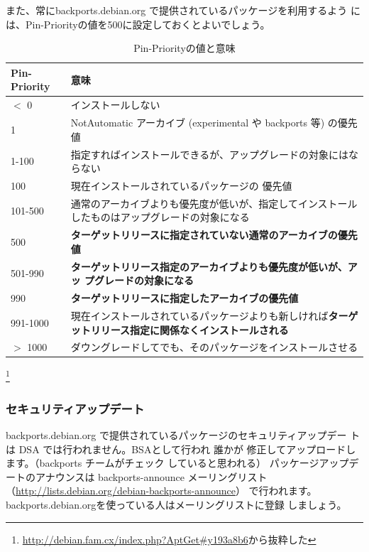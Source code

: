 \documentclass[mingoth,a4paper]{jsarticle}
\begin{document}
また、常にbackports.debian.org で提供されているパッケージを利用するよう
には、Pin-Priorityの値を500に設定しておくとよいでしょう。

\begin{table}[ht]
 \begin{center}
  \caption{Pin-Priorityの値と意味}
  \begin{tabular}{|l|p{30em}|}
   \hline
   Pin-Priority & 意味 \\ \hline \hline
   $<$ 0     & インストールしない \\ 
   1       & NotAutomatic アーカイブ (experimental や backports 等) の優先値 \\
   1-100   & 指定すればインストールできるが、アップグレードの対象にはならない\\
   100     & 現在インストールされているパッケージの 優先値\\
   101-500 & 通常のアーカイブよりも優先度が低いが、指定してインストールしたものはアップグレードの対象になる\\
   500     & \bf{ターゲットリリース}に指定されていない通常のアーカイブの優先値\\
   501-990 & \bf{ターゲットリリース}指定のアーカイブよりも優先度が低いが、アッ
   プグレードの対象になる\\
   990     & \bf{ターゲットリリース}に指定したアーカイブの優先値\\
   991-1000&現在インストールされているパッケージよりも新しければ\bf{ターゲットリリース}指定に関係なくインストールされる\\
   $>$ 1000  & ダウングレードしてでも、そのパッケージをインストールさせる\\
   \hline
  \end{tabular}
 \end{center}
 \footnote{\url{http://debian.fam.cx/index.php?AptGet\#y193a8b6}から抜粋した}
\end{table}

\subsubsection{セキュリティアップデート}
backports.debian.org で提供されているパッケージのセキュリティアップデー
トは DSA では行われません。BSAとして行われ 誰かが 修正してアップロードし
ます。（backports   チームがチェック していると思われる）
パッケージアップデートのアナウンスは
backports-announce メーリングリスト
（\url{http://lists.debian.org/debian-backports-announce}）
で行われます。backports.debian.orgを使っている人はメーリングリストに登録
しましょう。
\end{document}
